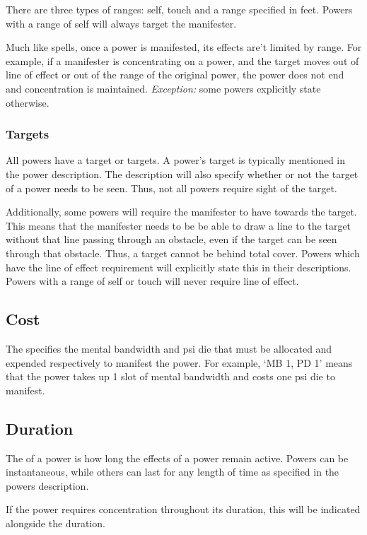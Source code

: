 There are three types of ranges: self, touch and a range
specified in feet.
Powers with a range of self will always target the manifester.

Much like spells,
once a power is manifested,
its effects are't limited by range.
For example,
if a manifester is concentrating on a power,
and the target moves out of line of effect or out of
the range of the original power,
the power does not end and concentration is maintained.
\textit{Exception:} some powers explicitly state otherwise.

\subsubsection{Targets}
\label{subs:targets}
All powers have a target or targets.
A power's target is typically mentioned in the power description.
The description will also specify whether or not the target
of a power needs to be seen.
Thus, not all powers require sight of the target.

Additionally, some powers will
require the manifester to have 
towards the target.
This means that the manifester needs to be be able to draw a line
to the target without that line passing through an obstacle,
even if the target can be seen through that obstacle.
Thus, a target cannot be behind total cover.
Powers which have the line of effect requirement
will explicitly state this in their descriptions.
Powers with a range of self or touch
will never require line of effect.

\subsection{Cost}
The  specifies the mental bandwidth and psi die
that must be allocated and expended respectively to manifest the power.
For example,
`MB 1, PD 1'
means that the power takes up 1 slot of mental bandwidth
and costs one psi die to manifest.

\subsection{Duration}
The  of a power is how long the effects
of a power remain active.
Powers can be instantaneous,
while others can last for any length of time
as specified in the powers description.

If the power requires concentration throughout its duration,
this will be indicated alongside the duration.

